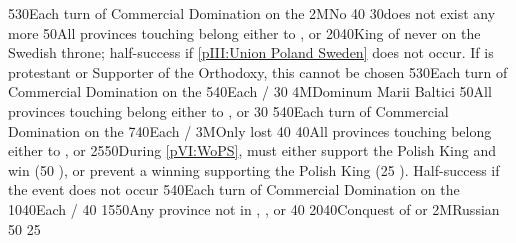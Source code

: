 %
%
%
{5}{30}{Each turn of Commercial Domination on the }%
%
\EUobjective2M{No }{}%
{}{40}{}%
%
%
{}{30}{\payshanse does not exist any more}%
%
%
{}{50}{All provinces touching \regionBaltique belong either to \SUE,
  \paysbrandebourg or \paysdanemark}%
%
%
{20}{40}{King of  never on the Swedish throne;
  half-success if \ref{pIII:Union Poland Sweden} does not occur. If \POL is
  protestant or Supporter of the Orthodoxy, this cannot be chosen}%
%
%
%
{5}{30}{Each turn of Commercial Domination on the }%
%
%
{5}{40}{Each \COL/\TP}%
%
%
{}{30}{}%
%
\EUobjective4M{Dominum Marii Baltici}{}%
{}{50}{All provinces touching \regionBaltique belong either to \SUE,
  \paysbrandebourg or \paysdanemark}%
%
%
{}{30}{}%
%
%
%
{5}{40}{Each turn of Commercial Domination on the }%
%
%
{7}{40}{Each \COL/\TP}%
%
\EUobjective3M{Only \provinceNeva lost}{}%
{}{40}{}%
%
%
{}{40}{All provinces touching \regionBaltique belong either to \SUE,
  \paysbrandebourg or \paysdanemark}%
%
%
{25}{50}{During \ref{pVI:WoPS}, \SUE must either support the Polish King and
  win (50 \VPs), or prevent a winning \FRA supporting the Polish King (25
  \VPs). Half-success if the event does not occur}%
%
%
%
{5}{40}{Each turn of Commercial Domination on the }%
%
%
{10}{40}{Each \COL/\TP}%
%
%
{}{40}{}%
%
 {15}{50}{Any province
  not in \regionNorvege, \regionDanemark, \regionFinlande or \regionSuede}%
%
%
{}{40}{}%
%
 
%
%
{20}{40}{Conquest of \payspskov or \paysryazan}%
%
\EUobjective2M{Russian \provinceSmolenska}{}%
{}{50}{}%
%
%
{}{25}{}%
%
%

